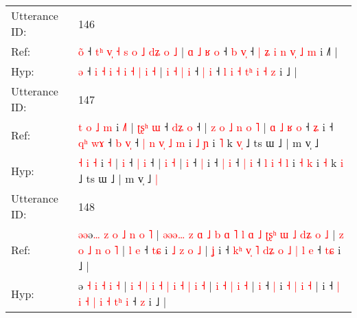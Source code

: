 \documentclass[10pt]{article}
\DeclareRobustCommand{\hl}[1]{{\textcolor{red}{#1}}}
\begin{document}
\begin{longtable}{ll}
 \\
\midrule
Utterance ID: & 146 \\
Ref: & \hl{o}\hl{̃} ˧ \hl{t}\hl{ʰ} \hl{v}\hl{̩} \hl{˧} \hl{s} \hl{o} \hl{˩} \hl{d}\hl{ʑ} \hl{o} \hl{˩} | \hl{ɑ} \hl{˩} \hl{ʁ} \hl{o} ˧ \hl{b} \hl{v}\hl{̩} ˧ \hl{|} \hl{ʑ} \hl{i} \hl{n}\hl{ }\hl{v}\hl{̩} \hl{˩} \hl{m} i ˩\hl{˥} |
 \\
Hyp: & \hl{}\hl{ə} ˧ \hl{}\hl{i} \hl{}\hl{˧} \hl{i} \hl{˧} \hl{i} \hl{˧} \hl{}\hl{|} \hl{i} \hl{˧} | \hl{i} \hl{˧} \hl{|} \hl{i} ˧ \hl{|} \hl{}\hl{i} ˧ \hl{l} \hl{i} \hl{˧} \hl{t}\hl{ʰ}\hl{ }\hl{i} \hl{˧} \hl{z} i ˩\hl{} |
 \\
\midrule
Utterance ID: & 147 \\
Ref: & \hl{t}\hl{ }\hl{o} \hl{˩} \hl{m} i \hl{˩}\hl{˥} |\hl{ }\hl{ʈ}\hl{ʂ}\hl{ʰ} \hl{ɯ} ˧ \hl{d}\hl{ʑ} \hl{o} ˧ |\hl{ }\hl{z}\hl{ }\hl{o}\hl{ }\hl{˩}\hl{ }\hl{n} \hl{o} \hl{˥} |\hl{ }\hl{ɑ}\hl{ }\hl{˩}\hl{ }\hl{ʁ} \hl{o} ˧ \hl{ʑ} i ˧ \hl{q}\hl{ʰ} \hl{w}\hl{ɤ} ˧ \hl{b} \hl{v}\hl{̩} ˧\hl{ }\hl{|} \hl{n} \hl{v}\hl{̩} \hl{˩} \hl{m} i \hl{˩} \hl{ɲ} i \hl{˥} k \hl{v}\hl{̩} ˩ ts ɯ ˩ | m v̩ ˩\hl{}\hl{}
 \\
Hyp: & \hl{}\hl{}\hl{˧} \hl{i} \hl{˧} i \hl{}\hl{˧} |\hl{}\hl{}\hl{}\hl{} \hl{i} ˧ \hl{}\hl{|} \hl{i} ˧ |\hl{}\hl{}\hl{}\hl{}\hl{}\hl{}\hl{}\hl{} \hl{i} \hl{˧} |\hl{}\hl{}\hl{}\hl{}\hl{}\hl{} \hl{i} ˧ \hl{|} i ˧ \hl{}\hl{|} \hl{}\hl{i} ˧ \hl{|} \hl{}\hl{i} ˧\hl{}\hl{} \hl{l} \hl{}\hl{i} \hl{˧} \hl{l} i \hl{˧} \hl{k} i \hl{˧} k \hl{}\hl{i} ˩ ts ɯ ˩ | m v̩ ˩\hl{ }\hl{|}
 \\
\midrule
Utterance ID: & 148 \\
Ref: & \hl{ə}\hl{ə}ə\hl{…}\hl{ }\hl{z} \hl{o} \hl{˩} \hl{n} \hl{o} \hl{˥} |\hl{ }\hl{ə}\hl{ə}\hl{ə}\hl{…}\hl{ }\hl{z}\hl{ }\hl{ɑ}\hl{ }\hl{˩}\hl{ }\hl{b} \hl{ɑ} \hl{˥} \hl{l} \hl{ɑ} \hl{˩} \hl{ʈ}\hl{ʂ}\hl{ʰ} \hl{ɯ} \hl{˩} \hl{d}\hl{ʑ} \hl{o} \hl{˩} |\hl{ }\hl{z} \hl{o} \hl{˩} \hl{n} \hl{o} \hl{˥} |\hl{ }\hl{l} \hl{e} ˧ \hl{t}\hl{ɕ} i \hl{˩} \hl{z} \hl{o} \hl{˩} |\hl{ }\hl{ʝ} i ˧ \hl{k}\hl{ʰ} \hl{v}\hl{̩} \hl{˥} \hl{d}\hl{ʑ} \hl{o} \hl{˩} \hl{|}\hl{ }\hl{l} \hl{e} ˧ \hl{t}\hl{ɕ} i ˩ |
 \\
Hyp: & \hl{}\hl{}ə\hl{}\hl{}\hl{} \hl{˧} \hl{i} \hl{˧} \hl{i} \hl{˧} |\hl{}\hl{}\hl{}\hl{}\hl{}\hl{}\hl{}\hl{}\hl{}\hl{}\hl{}\hl{}\hl{} \hl{i} \hl{˧} \hl{|} \hl{i} \hl{˧} \hl{}\hl{}\hl{|} \hl{i} \hl{˧} \hl{}\hl{|} \hl{i} \hl{˧} |\hl{}\hl{} \hl{i} \hl{˧} \hl{|} \hl{i} \hl{˧} |\hl{}\hl{} \hl{i} ˧ \hl{}\hl{|} i \hl{˧} \hl{|} \hl{i} \hl{˧} |\hl{}\hl{} i ˧ \hl{}\hl{|} \hl{}\hl{i} \hl{˧} \hl{}\hl{|} \hl{i} \hl{˧} \hl{}\hl{t}\hl{ʰ} \hl{i} ˧ \hl{}\hl{z} i ˩ |

\end{longtable}
\end{document}
